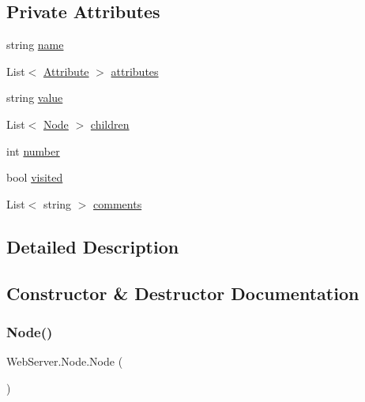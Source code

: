 \subsection*{Private Attributes}
\begin{DoxyCompactItemize}
\item 
string \hyperlink{class_web_server_1_1_node_ac58474b89bc13cbe40c299cc86fedefe}{name}
\item 
List$<$ \hyperlink{class_web_server_1_1_attribute}{Attribute} $>$ \hyperlink{class_web_server_1_1_node_ab4c0c0b68835841ba1dd836010f02711}{attributes}
\item 
string \hyperlink{class_web_server_1_1_node_a0368e279c654f5828875d262ea5244bf}{value}
\item 
List$<$ \hyperlink{class_web_server_1_1_node}{Node} $>$ \hyperlink{class_web_server_1_1_node_a4ac0ab74822287bac521f98fa81977eb}{children}
\item 
int \hyperlink{class_web_server_1_1_node_ae1cecbb35ce1b04501a6f65cd1e769c6}{number}
\item 
bool \hyperlink{class_web_server_1_1_node_a8e0d688e5b157e2b88b5fb6946cededc}{visited}
\item 
List$<$ string $>$ \hyperlink{class_web_server_1_1_node_a10e052748b400126a079251bdf9db91d}{comments}
\end{DoxyCompactItemize}


\subsection{Detailed Description}




\subsection{Constructor \& Destructor Documentation}
\mbox{\label{class_web_server_1_1_node_a120c3b8357a7b3c5b4b5871816f63cdd}} 
\subsubsection{\texorpdfstring{Node()}{Node()}}
{\footnotesize\ttfamily Web\+Server.\+Node.\+Node (\begin{DoxyParamCaption}{ }\end{DoxyParamCaption})}







